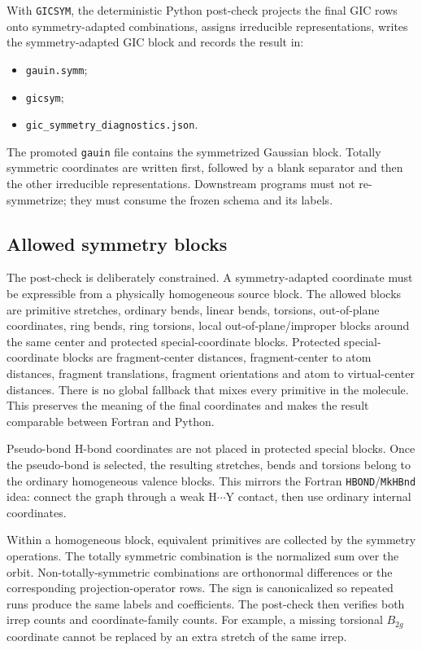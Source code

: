 \documentclass[11pt]{article}
\newcommand{\gauin}{\texttt{gauin}}
\begin{document}
With \texttt{GICSYM}, the deterministic Python post-check projects the final
GIC rows onto symmetry-adapted combinations, assigns irreducible
representations, writes the symmetry-adapted GIC block and records the result
in:

\begin{itemize}
  \item \texttt{gauin.symm};
  \item \texttt{gicsym};
  \item \texttt{gic\_symmetry\_diagnostics.json}.
\end{itemize}

\noindent
The promoted \gauin{} file contains the symmetrized Gaussian block.  Totally
symmetric coordinates are written first, followed by a blank separator and then
the other irreducible representations.  Downstream programs must not
re-symmetrize; they must consume the frozen schema and its labels.

\subsection{Allowed symmetry blocks}

The post-check is deliberately constrained.  A symmetry-adapted coordinate must
be expressible from a physically homogeneous source block.  The allowed blocks
are primitive stretches, ordinary bends, linear bends, torsions, out-of-plane
coordinates, ring bends, ring torsions, local out-of-plane/improper blocks
around the same center and protected special-coordinate blocks.  Protected
special-coordinate blocks are fragment-center distances, fragment-center to atom
distances, fragment translations, fragment orientations and atom to
virtual-center distances.  There is no global fallback that mixes every
primitive in the molecule.  This preserves the meaning of the final coordinates
and makes the result comparable between Fortran and Python.

Pseudo-bond H-bond coordinates are not placed in protected special blocks.  Once
the pseudo-bond is selected, the resulting stretches, bends and torsions belong
to the ordinary homogeneous valence blocks.  This mirrors the Fortran
\texttt{HBOND}/\texttt{MkHBnd} idea: connect the graph through a weak
H\(\cdots\)Y contact, then use ordinary internal coordinates.

Within a homogeneous block, equivalent primitives are collected by the symmetry
operations.  The totally symmetric combination is the normalized sum over the
orbit.  Non-totally-symmetric combinations are orthonormal differences or the
corresponding projection-operator rows.  The sign is canonicalized so repeated
runs produce the same labels and coefficients.  The post-check then verifies
both irrep counts and coordinate-family counts.  For example, a missing
torsional \(B_{2g}\) coordinate cannot be replaced by an extra stretch of the
same irrep.
\end{document}
